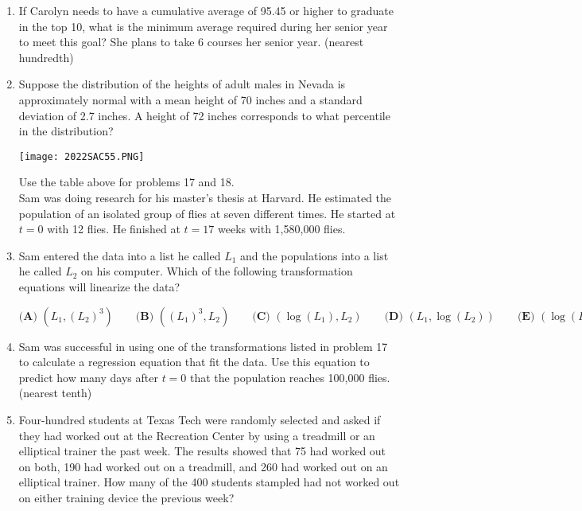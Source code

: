 \documentclass[../uilmath.tex]{subfiles}
\begin{document}
\begin{enumerate}[label=\bfseries\arabic*.]
    \item %
    If Carolyn needs to have a cumulative average of 95.45 or higher to graduate in the top 10, what is the minimum 
    average required during her senior year to meet this goal? She plans to take 6 courses her senior year. (nearest hundredth)

    \item %
    Suppose the distribution of the heights of adult males in Nevada is approximately normal with a mean height of 70 inches 
    and a standard deviation of 2.7 inches. A height of 72 inches corresponds to what percentile in the distribution?

    \begin{center}
        \texttt{[image: 2022SAC55.PNG]}
    \end{center}
    Use the table above for problems 17 and 18.\\
    Sam was doing research for his master's thesis at Harvard. He estimated the population 
    of an isolated group of flies at seven different times. He started at $t=0$ with 12 flies. He finished at $t=17$ weeks with 1,580,000 flies.
    \item %
    Sam entered the data into a list he called $L_1$ and the populations into a list he called $L_2$ on his computer. Which of the following transformation equations will linearize the data?
        
    $\textbf{(A) } (L_1,(L_2)^3) \qquad \textbf{(B) } ((L_1)^3,L_2) \qquad \textbf{(C) } (\log(L_1),L_2) \qquad \textbf{(D) } (L_1,\log(L_2)) \qquad \textbf{(E) } (\log(L_1),\log(L_2))$

    \item %
    Sam was successful in using one of the transformations listed in problem 17 to calculate a regression equation that fit the data. Use this equation 
    to predict how many days after $t=0$ that the population reaches 100,000 flies. (nearest tenth)

    \item %
    Four-hundred students at Texas Tech were randomly selected and asked if they had worked out at the Recreation Center by using a treadmill or an elliptical trainer the past week.
    The results showed that 75 had worked out on both, 190 had worked out on a treadmill, and 260 had worked out on an elliptical trainer. How many of the 400 students 
    stampled had not worked out on either training device the previous week?


\end{enumerate}
\end{document}

